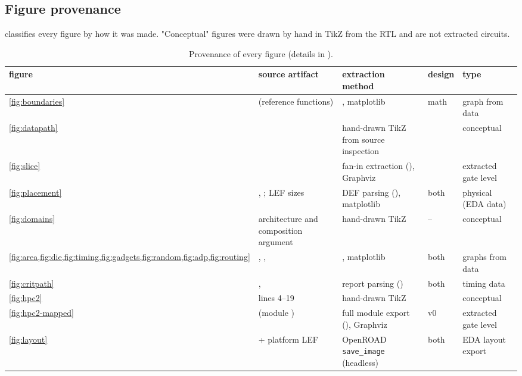 \subsection{Figure provenance}\label{app:provenance}
 classifies every figure by how it was made. "Conceptual" figures were drawn by hand in TikZ from the RTL and are not extracted circuits.

\begin{table}[h]\centering\scriptsize
\caption{Provenance of every figure (details in ).}\label{tab:provenance}
\setlength{\tabcolsep}{3pt}
\begin{tabularx}{\textwidth}{@{}R{2.4cm}YYR{1.6cm}R{2.2cm}@{}}
\toprule
figure & source artifact & extraction method & design & type \\
\midrule
\cref{fig:boundaries} &  (reference functions) &  , matplotlib & math & graph from data \\
\cref{fig:datapath} &  & hand-drawn TikZ from source inspection &  & conceptual \\
\cref{fig:slice} &  & fan-in extraction (), Graphviz &  & extracted gate level \\
\cref{fig:placement} & , ; LEF sizes & DEF parsing (), matplotlib & both & physical (EDA data) \\
\cref{fig:domains} & architecture and composition argument & hand-drawn TikZ & -- & conceptual \\
\cref{fig:area,fig:die,fig:timing,fig:gadgets,fig:random,fig:adp,fig:routing} & , ,  & , matplotlib & both & graphs from data \\
\cref{fig:critpath} & ,  & report parsing () & both & timing data \\
\cref{fig:hpc2} &  lines 4--19 & hand-drawn TikZ &  & conceptual \\
\cref{fig:hpc2-mapped} &  (module ) & full module export (), Graphviz &  v0 & extracted gate level \\
\cref{fig:layout} &  + platform LEF & OpenROAD \texttt{save\_image} (headless) & both & EDA layout export \\
\bottomrule
\end{tabularx}
\end{table}

